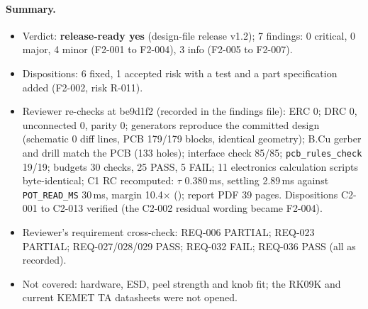 \paragraph{Summary.}
\begin{itemize}[noitemsep]
  \item Verdict: \textbf{release-ready yes} (design-file release v1.2); 7 findings:
        0 critical, 0 major, 4 minor (F2-001 to F2-004), 3 info (F2-005 to F2-007).
  \item Dispositions: 6 fixed, 1 accepted risk with a test and a part specification
        added (F2-002, risk R-011).
  \item Reviewer re-checks at be9d1f2 (recorded in the findings file): ERC 0; DRC 0,
        unconnected 0, parity 0; generators reproduce the committed design
        (schematic 0 diff lines, PCB 179/179 blocks, identical geometry); B.Cu gerber
        and drill match the PCB (133 holes); interface check 85/85;
        \nolinkurl{pcb_rules_check} 19/19; budgets 30 checks, 25 PASS, 5 FAIL; 11
        electronics calculation scripts byte-identical; C1 RC recomputed: $\tau$
        0.380\,ms, settling 2.89\,ms against \texttt{POT\_READ\_MS} 30\,ms, margin
        10.4$\times$ (); report PDF 39 pages. Dispositions C2-001 to
        C2-013 verified (the C2-002 residual wording became F2-004).
  \item Reviewer's requirement cross-check: REQ-006 PARTIAL; REQ-023 PARTIAL;
        REQ-027/028/029 PASS; REQ-032 FAIL; REQ-036 PASS (all as recorded).
  \item Not covered: hardware, ESD, peel strength and knob fit; the RK09K and current
        KEMET TA datasheets were not opened.
\end{itemize}

